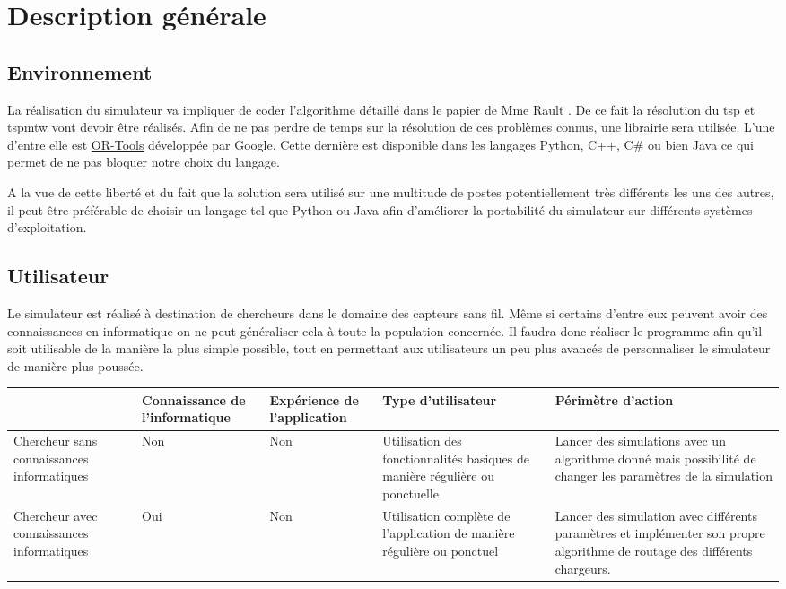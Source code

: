 \documentclass[final]{polytech/polytech}
\begin{document}
\chapter{Description générale}
	\section{Environnement}
		La réalisation du simulateur va impliquer de coder l'algorithme détaillé dans le papier de Mme Rault \cite{Rault:chargers}.
		De ce fait la résolution du \gls{tsp} et \gls{tspmtw} vont devoir être réalisés.
		Afin de ne pas perdre de temps sur la résolution de ces problèmes connus, une librairie sera utilisée.
		L'une d'entre elle est \href{https://developers.google.com/optimization/}{OR-Tools} développée par Google.
		Cette dernière est disponible dans les langages Python, C++, C\# ou bien Java ce qui permet de ne pas bloquer notre choix du langage.
		
		A la vue de cette liberté et du fait que la solution sera utilisé sur une multitude de postes potentiellement très différents les uns des autres, il peut être préférable de choisir un langage tel que Python ou Java afin d'améliorer la portabilité du simulateur sur différents systèmes d'exploitation.
	
	\section{Utilisateur\label{sec:users}}
		Le simulateur est réalisé à destination de chercheurs dans le domaine des capteurs sans fil.
		Même si certains d'entre eux peuvent avoir des connaissances en informatique on ne peut généraliser cela à toute la population concernée.
		Il faudra donc réaliser le programme afin qu'il soit utilisable de la manière la plus simple possible, tout en permettant aux utilisateurs un peu plus avancés de personnaliser le simulateur de manière plus poussée.
		
		\begin{center}
			\centering
			\begin{tabularx}{\textwidth}{|X||X|X|X|X|}
				\hline
				& Connaissance de l'informatique & Expérience de l'application & Type d'utilisateur & Périmètre d'action\\\hline\hline
				Chercheur sans connaissances informatiques & Non & Non & Utilisation des fonctionnalités basiques de manière régulière ou ponctuelle & Lancer des simulations avec un algorithme donné mais possibilité de changer les paramètres de la simulation\\\hline
				Chercheur avec connaissances informatiques & Oui & Non & Utilisation complète de l'application de manière régulière ou ponctuel & Lancer des simulation avec différents paramètres et implémenter son propre algorithme de routage des différents chargeurs.\\\hline
			\end{tabularx}
		\end{center}
\end{document}
